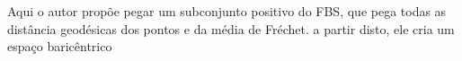 \documentclass[a4paper,titlepage]{article}
\begin{document}
Aqui o autor propõe pegar um subconjunto positivo do FBS, que pega todas as distância geodésicas dos pontos e da média de Fréchet. a partir disto, ele cria um espaço baricêntrico 

{
\vspace{1em}
\vspace{1em}
}

{
\vspace{1em}
\vspace{1em}
}
\end{document}
